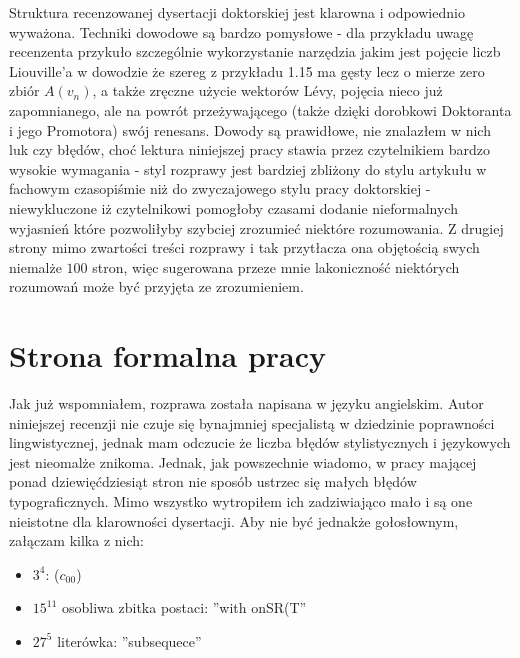 \documentclass[12pt]{article}
\begin{document}
  Struktura recenzowanej dysertacji doktorskiej jest
klarowna i odpowiednio wyważona. Techniki dowodowe 
są bardzo pomysłowe - dla przykładu uwagę recenzenta 
przykuło szczególnie wykorzystanie narzędzia jakim jest
pojęcie liczb Liouville'a w dowodzie że szereg z przykładu
1.15 ma gęsty lecz o mierze zero zbiór $A(v_n)$, a także
zręczne użycie wektorów L\'evy, pojęcia nieco już 
zapomnianego, ale na powrót 
przeżywającego (także dzięki dorobkowi Doktoranta i jego Promotora) 
swój renesans. 
  Dowody są prawidłowe, nie znalazłem w nich luk czy 
błędów, choć lektura niniejszej pracy stawia przez
czytelnikiem bardzo wysokie wymagania - styl rozprawy
jest bardziej zbliżony do stylu artykułu w fachowym czasopiśmie
niż do zwyczajowego stylu pracy doktorskiej - niewykluczone
iż czytelnikowi pomogłoby czasami dodanie nieformalnych
wyjasnień które pozwoliłyby szybciej zrozumieć niektóre 
rozumowania. Z drugiej strony mimo zwartości treści 
rozprawy i tak przytłacza ona objętością swych niemalże
$100$ stron, więc sugerowana przeze mnie lakoniczność
niektórych rozumowań może być przyjęta ze zrozumieniem.


\section{Strona formalna pracy}

  Jak już wspomniałem, rozprawa została napisana w języku angielskim. 
Autor niniejszej recenzji nie czuje się
bynajmniej specjalistą w dziedzinie poprawności lingwistycznej, jednak
mam odczucie że liczba błędów stylistycznych i językowych jest 
nieomalże znikoma. Jednak, jak powszechnie wiadomo, w pracy mającej ponad dziewięćdziesiąt
stron nie sposób ustrzec się małych błędów typograficznych. Mimo
wszystko wytropiłem ich zadziwiająco mało i są one 
nieistotne dla klarowności dysertacji. Aby nie być 
jednakże gołosłownym, załączam kilka z nich:

\begin{itemize}
\item
  $3^4$: ($c_{00}$)
\item 
  $15^{11}$ osobliwa zbitka postaci: ''with onSR(T''
\item
  $27^5$ literówka: ''subsequece''
\end{itemize}
\end{document}
